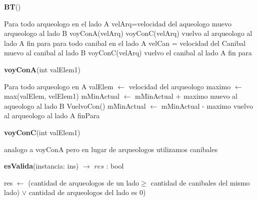 \documentclass[spanish,12pt]{article}
\begin{document}
\begin{algorithm}[H]{\textbf{BT}() }
	\begin{algorithmic}
		\State Para todo arqueologo en el lado A
		\State \quad  velArq=velocidad del aqueologo
		\State \quad muevo arqueologo al lado B
		\State \quad voyConA(velArq)
		\State \quad voyConC(velArq)
		\State \quad vuelvo al arqueologo al lado A
		\State fin para
		\State para todo canibal en el lado A
		\State \quad velCan = velocidad del Canibal
		\State \quad muevo al canibal al lado B
		\State \quad voyConC(velArq)
		\State \quad  vuelvo el canibal al lado A
		\State fin para
	\end{algorithmic}
\end{algorithm}

\begin{algorithm}[H]{\textbf{voyConA}(int valElem1)}
	\begin{algorithmic}
	\State Para todo arqueologo en A
	\State \qquad valElem $\gets$ velocidad del arqueologo
	\State \qquad maximo $\gets$ max(valElem, velElem1)
	\State \qquad mMinActual $\gets$ mMinActual + maximo
	\State \qquad muevo al aqueologo al lado B
	\State \qquad VuelvoCon()
	\State \qquad mMinActual $\gets$ mMinActual - maximo
	\State \qquad vuelvo al arqueologo al lado A
	\State finPara
	\end{algorithmic}
\end{algorithm}

\begin{algorithm}[H]{\textbf{voyConC}(int valElem1)}
	\begin{algorithmic}
		\State  analogo a voyConA pero en lugar de arqueologos utilizamos canibales
	\end{algorithmic}
\end{algorithm}

\begin{algorithm}[H]{\textbf{esValida}(instancia: ins) $\to$ $res$ : bool }
	\begin{algorithmic}
	 res $\gets$ (cantidad de arqueologos de un lado$\geq$ cantidad de canibales del mismo lado) $\lor$ cantidad de arqueologos del lado es 0)
	\end{algorithmic}
\end{algorithm}
\end{document}
